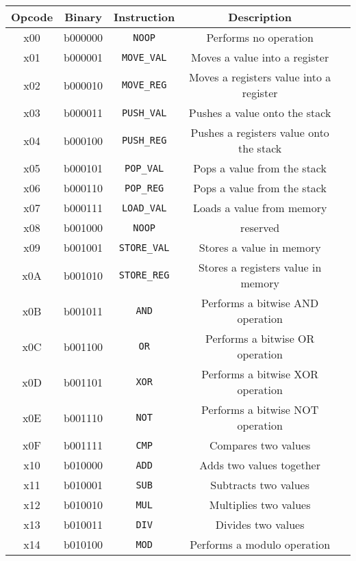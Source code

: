 \documentclass[12pt,a4paper]{article}
\begin{document}
\begin{center}
\begin{tabular}{ c c c c c }
    \textbf{Opcode} & \textbf{Binary} & \textbf{Instruction} & \textbf{Description} \\
    \hline
    x00 & b000000 & \texttt{NOOP} & Performs no operation \\

    \hline

    x01 & b000001 & \texttt{MOVE\_VAL} & Moves a value into a register \\
    x02 & b000010 & \texttt{MOVE\_REG} & Moves a registers value into a register \\

    \hline

    x03 & b000011 & \texttt{PUSH\_VAL} & Pushes a value onto the stack \\
    x04 & b000100 & \texttt{PUSH\_REG} & Pushes a registers value onto the stack \\

    x05 & b000101 & \texttt{POP\_VAL} & Pops a value from the stack \\
    x06 & b000110 & \texttt{POP\_REG} & Pops a value from the stack \\

    x07 & b000111 & \texttt{LOAD\_VAL} & Loads a value from memory \\
    x08 & b001000 & \texttt{NOOP} & reserved \\

    x09 & b001001 & \texttt{STORE\_VAL} & Stores a value in memory \\
    x0A & b001010 & \texttt{STORE\_REG} & Stores a registers value in memory \\

    \hline

    x0B & b001011 & \texttt{AND} & Performs a bitwise AND operation \\
    x0C & b001100 & \texttt{OR} & Performs a bitwise OR operation \\
    x0D & b001101 & \texttt{XOR} & Performs a bitwise XOR operation \\
    x0E & b001110 & \texttt{NOT} & Performs a bitwise NOT operation \\
    x0F & b001111 & \texttt{CMP} & Compares two values \\

    \hline

    x10 & b010000 & \texttt{ADD} & Adds two values together \\
    x11 & b010001 & \texttt{SUB} & Subtracts two values \\
    x12 & b010010 & \texttt{MUL} & Multiplies two values \\
    x13 & b010011 & \texttt{DIV} & Divides two values \\
    x14 & b010100 & \texttt{MOD} & Performs a modulo operation \\


\end{tabular}
\end{center}
\end{document}
